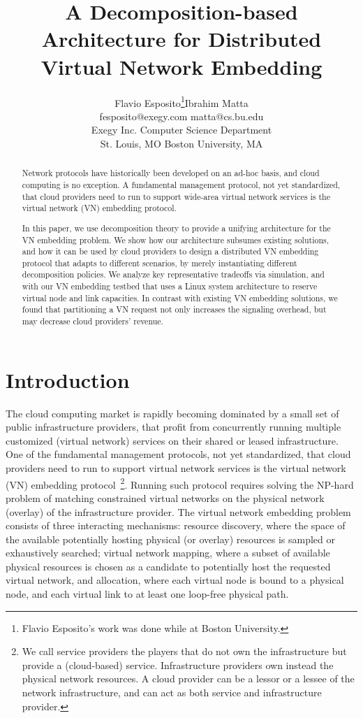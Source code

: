 \documentclass[a4paper, 10pt, conference]{ieeeconf}
\author{
\begin{tabular}{cccc}
\vspace{-0.05in}
Flavio Esposito\thanks{Flavio Esposito's work was done while at Boston University.} &&   Ibrahim Matta   \\
{\small \; fesposito@exegy.com } && {\small \; matta@cs.bu.edu } \\
{\normalsize Exegy Inc. } && \normalsize{Computer Science Department} \\
{\normalsize St. Louis, MO } && \normalsize{Boston University, MA}  
\end{tabular}
}
\title{\Large \bf
A Decomposition-based Architecture for Distributed Virtual Network Embedding 
}
\begin{document}
\maketitle
\thispagestyle{empty}
\pagestyle{empty}

\begin{abstract}
Network protocols have historically been developed on an ad-hoc basis, and cloud computing is no exception. A fundamental management protocol, not yet standardized, that cloud providers need to run to support wide-area virtual network services is the virtual network (VN) embedding protocol. 

In this paper, we use decomposition theory to provide a unifying architecture  for the VN embedding problem. We show how our architecture subsumes existing solutions, and how it can be used by cloud providers to design a distributed VN embedding protocol that adapts to different scenarios, by merely instantiating different decomposition policies. We analyze key representative tradeoffs via simulation, and with our VN embedding testbed that uses a Linux system architecture to reserve virtual node and link capacities. 
In contrast with existing VN embedding solutions, we found that partitioning a VN request not only increases the signaling overhead, but may decrease cloud providers' revenue.
\end{abstract}
\vspace{-2mm}



\section{Introduction}\label{sec:intro}



The cloud computing market is rapidly becoming dominated by a small set of public infrastructure providers, that profit from concurrently running multiple customized (virtual network) services on their shared or leased infrastructure. 
One of the fundamental management protocols, not yet standardized, that cloud providers need to run to support virtual network services is the virtual network (VN) embedding protocol~\footnote{We call service providers the players that do not own the infrastructure but provide a (cloud-based) service. Infrastructure providers own instead the physical network resources. A cloud provider can be a lessor or a lessee of the network infrastructure, and can act as both service and infrastructure provider.}. 
Running such protocol requires solving the NP-hard problem of matching constrained virtual networks on the physical network (overlay) of the infrastructure provider. The virtual network embedding problem consists of three interacting mechanisms:  resource discovery, where the space of the available potentially hosting physical (or overlay) resources is sampled or exhaustively searched;  virtual network mapping, where a subset of  available physical resources is chosen as a candidate to potentially host the requested virtual network, and  allocation, where each virtual node is bound to a physical node, and each virtual link to at least one loop-free physical path. 
\end{document}
